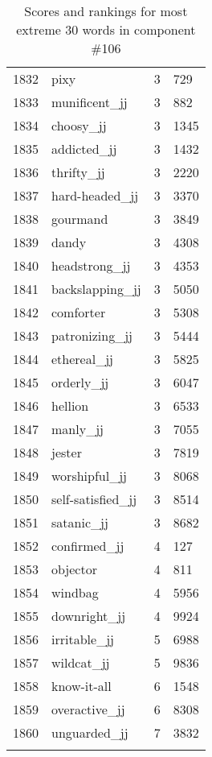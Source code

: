 \begin{longtable}[!htbp]{| rlr@{.}l |}
    1832 & pixy & 3 & 729 \\
    1833 & munificent\_jj & 3 & 882 \\
    1834 & choosy\_jj & 3 & 1345 \\
    1835 & addicted\_jj & 3 & 1432 \\
    1836 & thrifty\_jj & 3 & 2220 \\
    1837 & hard-headed\_jj & 3 & 3370 \\
    1838 & gourmand & 3 & 3849 \\
    1839 & dandy & 3 & 4308 \\
    1840 & headstrong\_jj & 3 & 4353 \\
    1841 & backslapping\_jj & 3 & 5050 \\
    1842 & comforter & 3 & 5308 \\
    1843 & patronizing\_jj & 3 & 5444 \\
    1844 & ethereal\_jj & 3 & 5825 \\
    1845 & orderly\_jj & 3 & 6047 \\
    1846 & hellion & 3 & 6533 \\
    1847 & manly\_jj & 3 & 7055 \\
    1848 & jester & 3 & 7819 \\
    1849 & worshipful\_jj & 3 & 8068 \\
    1850 & self-satisfied\_jj & 3 & 8514 \\
    1851 & satanic\_jj & 3 & 8682 \\
    1852 & confirmed\_jj & 4 & 127 \\
    1853 & objector & 4 & 811 \\
    1854 & windbag & 4 & 5956 \\
    1855 & downright\_jj & 4 & 9924 \\
    1856 & irritable\_jj & 5 & 6988 \\
    1857 & wildcat\_jj & 5 & 9836 \\
    1858 & know-it-all & 6 & 1548 \\
    1859 & overactive\_jj & 6 & 8308 \\
    1860 & unguarded\_jj & 7 & 3832 \\
    \hline
    \caption{Scores and rankings for most extreme 30 words in component \#106} \\
\end{longtable}
